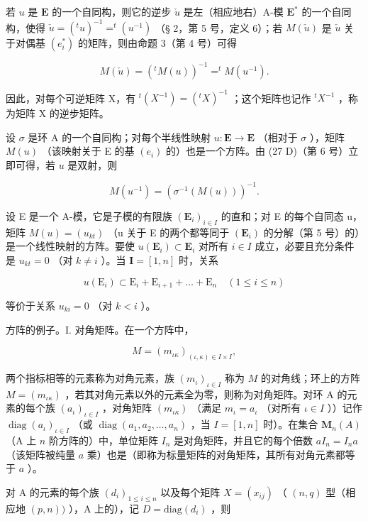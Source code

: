 若 \(u\) 是 \(\mathbf{E}\) 的一个自同构，则它的逆步 \(\check{u}\) 是左（相应地右）A-模 \(\mathbf{E}^*\) 的一个自同构，使得 \(\check{u} = (^{t}u)^{-1} = ^{t}(u^{-1})\) （§ 2，第 5 号，定义 6）；若 \(M(\check{u})\) 是 \(\check{u}\) 关于对偶基 \((e_{i}^{*})\) 的矩阵，则由命题 3（第 4 号）可得

\[
M (\check {u}) = (^ {t} M (u)) ^ {- 1} = ^ {t} M (u ^ {- 1}).\tag{29}
\]

因此，对每个可逆矩阵 X，有 \({}^{t}(X^{-1}) = ({}^{t}X)^{-1}\) ；这个矩阵也记作 \({}^{t}X^{-1}\) ，称为矩阵 X 的逆步矩阵。

设 \(\sigma\) 是环 A 的一个自同构；对每个半线性映射 \(u: \mathbf{E} \to \mathbf{E}\) （相对于 \(\sigma\) ），矩阵 \(M(u)\) （该映射关于 E 的基 \((e_i)\) 的）也是一个方阵。由 (27 D)（第 6 号）立即可得，若 \(u\) 是双射，则

\[
M (u ^ {- 1}) = (\sigma^ {- 1} (M (u))) ^ {- 1}.
\]

设 E 是一个 A-模，它是子模的有限族 \((\mathbf{E}_{i})_{i\in I}\) 的直和；对 E 的每个自同态 u，矩阵 \(M(u)=(u_{kt})\) （u 关于 E 的两个都等同于 \((\mathbf{E}_{i})\) 的分解（第 5 号）的）是一个线性映射的方阵。要使 \(u(\mathbf{E}_{i})\subset\mathbf{E}_{i}\) 对所有 \(i\in I\) 成立，必要且充分条件是 \(u_{kt}=0\) （对 \(k\neq i\) ）。当 \(\mathbf{I} = [1, n]\) 时，关系

\[
u (\mathrm{E} _ {i}) \subset \mathrm{E} _ {i} + \mathrm{E} _ {i + 1} + \dots + \mathrm{E} _ {n} \quad (1 \leqslant i \leqslant n)
\]

等价于关系 \(u_{ki} = 0\) （对 \(k < i\) ）。

方阵的例子。I. 对角矩阵。在一个方阵中，

\[
M = \left(m _ {\iota \kappa}\right) _ {(\iota, \kappa) \in I \times I},
\]

两个指标相等的元素称为对角元素，族 \((m_{\iota})_{\iota \in I}\) 称为 \(M\) 的对角线；环上的方阵 \(M = (m_{\iota \kappa})\) ，若其对角元素以外的元素全为零，则称为对角矩阵。对环 A 的元素的每个族 \((a_{\iota})_{\iota \in I}\) ，对角矩阵 \((m_{\iota \kappa})\) （满足 \(m_{\iota} = a_{\iota}\) （对所有 \(\iota \in I\) ））记作 \(\operatorname{diag}(a_{\iota})_{\iota \in I}\) （或 \(\operatorname{diag}(a_1, a_2, \ldots, a_n)\) ，当 \(I = [1, n]\) 时）。在集合 \(\mathbf{M}_n(A)\) （A 上 \(n\) 阶方阵的）中，单位矩阵 \(I_n\) 是对角矩阵，并且它的每个倍数 \(aI_n = I_na\) （该矩阵被纯量 \(a\) 乘）也是（即称为标量矩阵的对角矩阵，其所有对角元素都等于 \(a\) ）。

对 A 的元素的每个族 \((d_i)_{1\leqslant i\leqslant n}\) 以及每个矩阵 \(X = (x_{ij})\) （ \((n,q)\) 型（相应地 \((p,n))\) ），A 上的），记 \(D = \mathrm{diag}(d_i)\) ，则

